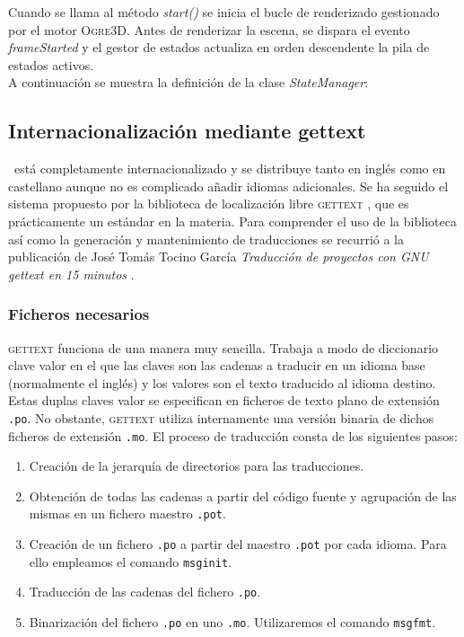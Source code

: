 Cuando se llama al método \textit{start()} se inicia el bucle de renderizado
gestionado por el motor \textsc{Ogre3D}. Antes de renderizar la escena,
se dispara el evento \textit{frameStarted} y el gestor de estados actualiza
en orden descendente la pila de estados activos.\\

A continuación se muestra la definición de la clase \textit{StateManager}:\\



\subsection{Internacionalización mediante gettext}
\label{siontower-internacionalizacion}


\juego\ está completamente internacionalizado y se distribuye tanto en inglés
como en castellano aunque no es complicado añadir idiomas adicionales. Se
ha seguido el sistema propuesto por la biblioteca de localización libre
\textsc{gettext} \cite{website:gettext}, que es prácticamente un estándar en la materia. Para
comprender el uso de la biblioteca así como la generación y mantenimiento
de traducciones se recurrió a la publicación de José Tomás Tocino García
\textit{Traducción de proyectos con GNU gettext en 15 minutos} \cite{pdf:jtgettext}.\\

\subsubsection{Ficheros necesarios}

\textsc{gettext} funciona de una manera muy sencilla. Trabaja a modo de diccionario
clave valor en el que las claves son las cadenas a traducir en un idioma base
(normalmente el inglés) y los valores son el texto traducido al idioma destino.
Estas duplas claves valor se especifican en ficheros de texto plano de extensión
\texttt{.po}. No obstante, \textsc{gettext} utiliza internamente una versión
binaria de dichos ficheros de extensión \texttt{.mo}. El proceso de traducción
consta de los siguientes pasos:

\begin{enumerate}
    \itemsep0em
    \item Creación de la jerarquía de directorios para las traducciones.
    \item Obtención de todas las cadenas a partir del código fuente y agrupación
    de las mismas en un fichero maestro \texttt{.pot}.
    \item Creación de un fichero \texttt{.po} a partir del maestro \texttt{.pot}
    por cada idioma. Para ello empleamos el comando \texttt{msginit}.
    \item Traducción de las cadenas del fichero \texttt{.po}.
    \item Binarización del fichero \texttt{.po} en uno \texttt{.mo}. Utilizaremos
    el comando \texttt{msgfmt}.
\end{enumerate}


